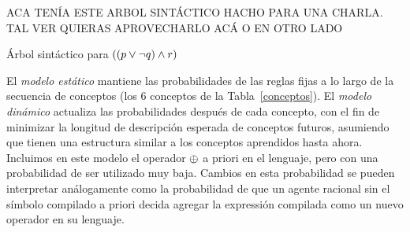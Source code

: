 \color{red}
ACA TENÍA ESTE ARBOL SINTÁCTICO HACHO PARA UNA CHARLA. TAL VER QUIERAS APROVECHARLO ACÁ O EN OTRO LADO

Árbol sintáctico para $((p \vee \lnot q) \wedge r)$



\color{black}



El \textit{modelo estático} mantiene las probabilidades de las reglas fijas a lo largo de la secuencia de conceptos (los 6 conceptos de la Tabla~\ref{conceptos}). El \textit{modelo dinámico} actualiza las probabilidades después de cada concepto, con el fin de minimizar la longitud de descripción esperada de conceptos futuros, asumiendo que tienen una estructura similar a los conceptos aprendidos hasta ahora. Incluimos en este modelo el operador $\oplus$ a priori en el lenguaje, pero con una probabilidad de ser utilizado muy baja. Cambios en esta probabilidad se pueden interpretar análogamente como la probabilidad de que un agente racional sin el símbolo compilado a priori decida agregar la expressión compilada como un nuevo operador en su lenguaje.


